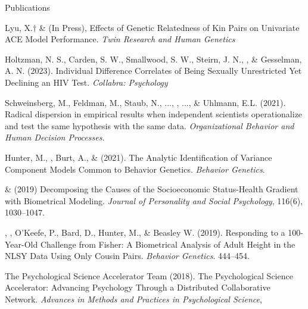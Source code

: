 \begin{rSection}{\textrm{Publications}}%
\begin{etaremune}

\item Lyu, X.$\dagger$ \& \meb (In Press), Effects of Genetic Relatedness of Kin Pairs on Univariate ACE Model Performance. \textit{Twin Research and Human Genetics}  

\item Holtzman, N. S., Carden, S. W., Smallwood, S. W., Steirn, J. N., \meb, \& Gesselman, A. N. (2023). Individual Difference Correlates of Being Sexually Unrestricted Yet Declining an HIV Test. \textit{Collabra: Psychology} 
%
\item Schweinsberg, M., Feldman, M., Staub, N., ..., \meb, ..., \& Uhlmann, E.L. (2021). Radical dispersion in empirical results when independent scientists operationalize and test the same hypothesis with the same data. \textit{Organizational Behavior and Human Decision Processes}. 
%
\item Hunter, M., \meb, Burt, A., \& \joe (2021). The Analytic Identification of Variance Component Models Common to Behavior Genetics. \textit{Behavior Genetics}. 
%
\item \meb \& \joe (2019) Decomposing the Causes of the Socioeconomic Status-Health Gradient with Biometrical Modeling. \textit{Journal of Personality and Social Psychology}, 116(6), 1030–1047.  %
%
\item\Joe, \meb, O'Keefe, P., Bard, D., Hunter, M., \& Beasley W. (2019). Responding to a 100-Year-Old Challenge from Fisher: A Biometrical Analysis of Adult Height in the NLSY Data Using Only Cousin Pairs. \textit{Behavior Genetics}. 444–454. 
%
\item The Psychological Science Accelerator Team (2018). The Psychological Science Accelerator: Advancing Psychology Through a Distributed Collaborative Network. \textit{Advances in Methods and Practices in Psychological Science}, 

\end{etaremune}
\end{rSection}
